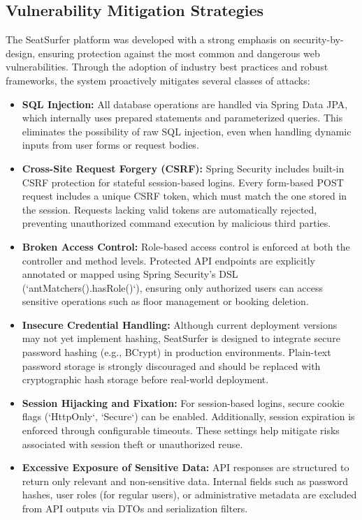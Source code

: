 \documentclass[12pt,a4paper]{report} %
\begin{document}
\subsection{Vulnerability Mitigation Strategies}

The SeatSurfer platform was developed with a strong emphasis on security-by-design, ensuring protection against the most common and dangerous web vulnerabilities. Through the adoption of industry best practices and robust frameworks, the system proactively mitigates several classes of attacks:

\begin{itemize}
\item \textbf{SQL Injection:}
All database operations are handled via Spring Data JPA, which internally uses prepared statements and parameterized queries. This eliminates the possibility of raw SQL injection, even when handling dynamic inputs from user forms or request bodies.
\item \textbf{Cross-Site Request Forgery (CSRF):}  
Spring Security includes built-in CSRF protection for stateful session-based logins. Every form-based POST request includes a unique CSRF token, which must match the one stored in the session. Requests lacking valid tokens are automatically rejected, preventing unauthorized command execution by malicious third parties.

\item \textbf{Broken Access Control:}  
Role-based access control is enforced at both the controller and method levels. Protected API endpoints are explicitly annotated or mapped using Spring Security's DSL (`antMatchers().hasRole()`), ensuring only authorized users can access sensitive operations such as floor management or booking deletion.

\item \textbf{Insecure Credential Handling:}  
Although current deployment versions may not yet implement hashing, SeatSurfer is designed to integrate secure password hashing (e.g., BCrypt) in production environments. Plain-text password storage is strongly discouraged and should be replaced with cryptographic hash storage before real-world deployment.

\item \textbf{Session Hijacking and Fixation:}  
For session-based logins, secure cookie flags (`HttpOnly`, `Secure`) can be enabled. Additionally, session expiration is enforced through configurable timeouts. These settings help mitigate risks associated with session theft or unauthorized reuse.

\item \textbf{Excessive Exposure of Sensitive Data:}  
API responses are structured to return only relevant and non-sensitive data. Internal fields such as password hashes, user roles (for regular users), or administrative metadata are excluded from API outputs via DTOs and serialization filters.
\end{itemize}
\end{document}
